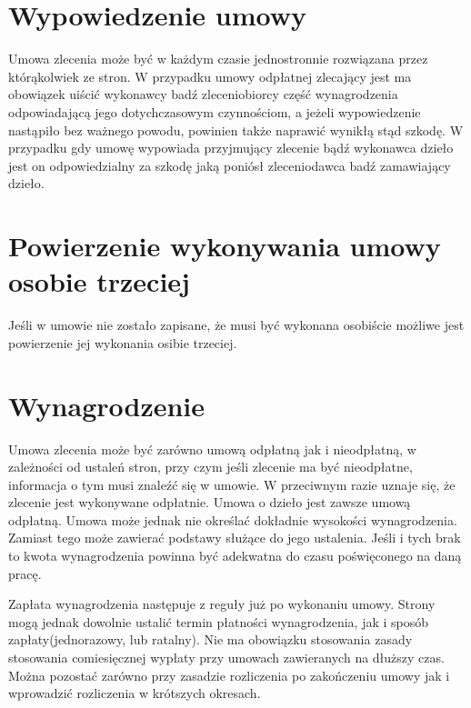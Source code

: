 \section[Wypowiedzenie umowy][Wypowiedzenie umowy]{Wypowiedzenie umowy}
Umowa zlecenia może być w każdym czasie jednostronnie rozwiązana przez którąkolwiek ze stron. W przypadku umowy odpłatnej zlecający jest ma obowiązek uiścić wykonawcy badź zleceniobiorcy część wynagrodzenia odpowiadającą jego dotychczasowym czynnościom, a jeżeli wypowiedzenie nastąpiło bez ważnego powodu, powinien także naprawić wynikłą stąd szkodę. W przypadku gdy umowę wypowiada przyjmujący zlecenie bądź wykonawca dzieło jest on odpowiedzialny za szkodę jaką poniósł zleceniodawca badź zamawiający dzieło.

\section[Powierzenie wykonywania umowy osobie trzeciej][Powierzenie wykonywania umowy osobie trzeciej]{Powierzenie wykonywania umowy osobie trzeciej}
Jeśli w umowie nie zostało zapisane, że musi być wykonana osobiście możliwe jest powierzenie jej wykonania osibie trzeciej.

\section[Wynagrodzenie][Wynagrodzenie]{Wynagrodzenie}
Umowa zlecenia może być zarówno umową odpłatną jak i nieodpłatną, w zależności od ustaleń stron, przy czym jeśli zlecenie ma być nieodpłatne, informacja o tym musi znaleźć się w umowie. W przeciwnym razie uznaje się, że zlecenie jest wykonywane odpłatnie. Umowa o dzieło jest zawsze umową odpłatną. Umowa może jednak nie określać dokładnie wysokości wynagrodzenia. Zamiast tego może zawierać podstawy służące do jego ustalenia. Jeśli i tych brak to kwota wynagrodzenia powinna być adekwatna do czasu poświęconego na daną pracę.

Zapłata wynagrodzenia następuje z reguły już po wykonaniu umowy. Strony mogą jednak dowolnie ustalić termin płatności wynagrodzenia, jak i sposób zapłaty(jednorazowy, lub ratalny). Nie ma obowiązku stosowania zasady stosowania comiesięcznej wypłaty przy umowach zawieranych na dłuższy czas. Można pozostać zarówno przy zasadzie rozliczenia po zakończeniu umowy jak i wprowadzić rozliczenia w krótszych okresach.

